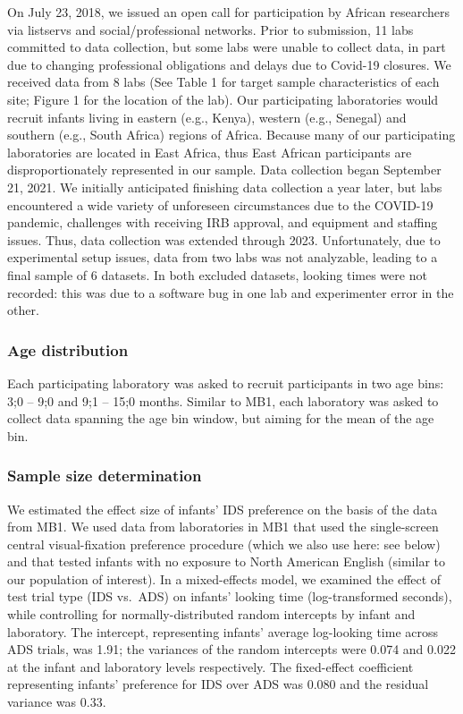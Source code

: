 \documentclass[
  ,man,floatsintext]{apa6}
\begin{document}
On July 23, 2018, we issued an open call for participation by African researchers via listservs and social/professional networks. Prior to submission, 11 labs committed to data collection, but some labs were unable to collect data, in part due to changing professional obligations and delays due to Covid-19 closures. We received data from 8 labs (See Table 1 for target sample characteristics of each site; Figure 1 for the location of the lab). Our participating laboratories would recruit infants living in eastern (e.g., Kenya), western (e.g., Senegal) and southern (e.g., South Africa) regions of Africa. Because many of our participating laboratories are located in East Africa, thus East African participants are disproportionately represented in our sample. Data collection began September 21, 2021. We initially anticipated finishing data collection a year later, but labs encountered a wide variety of unforeseen circumstances due to the COVID-19 pandemic, challenges with receiving IRB approval, and equipment and staffing issues. Thus, data collection was extended through 2023. Unfortunately, due to experimental setup issues, data from two labs was not analyzable, leading to a final sample of 6 datasets. In both excluded datasets, looking times were not recorded: this was due to a software bug in one lab and experimenter error in the other.

\hypertarget{age-distribution}{%
\subsubsection{Age distribution}\label{age-distribution}}

Each participating laboratory was asked to recruit participants in two age bins: 3;0 -- 9;0 and 9;1 -- 15;0 months. Similar to MB1, each laboratory was asked to collect data spanning the age bin window, but aiming for the mean of the age bin.

\hypertarget{sample-size-determination}{%
\subsubsection{Sample size determination}\label{sample-size-determination}}

We estimated the effect size of infants' IDS preference on the basis of the data from MB1. We used data from laboratories in MB1 that used the single-screen central visual-fixation preference procedure (which we also use here: see below) and that tested infants with no exposure to North American English (similar to our population of interest). In a mixed-effects model, we examined the effect of test trial type (IDS vs.~ADS) on infants' looking time (log-transformed seconds), while controlling for normally-distributed random intercepts by infant and laboratory. The intercept, representing infants' average log-looking time across ADS trials, was 1.91; the variances of the random intercepts were 0.074 and 0.022 at the infant and laboratory levels respectively. The fixed-effect coefficient representing infants' preference for IDS over ADS was 0.080 and the residual variance was 0.33.
\end{document}
